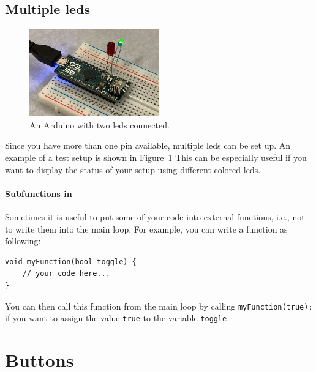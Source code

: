 \subsection{Multiple \acp{led}}

\begin{figure}[tb]
    \centering
    \includegraphics[width=0.5\textwidth]{graphics/01_blink/arduino_two_leds.jpg}
    \caption{An Arduino with two \acp{led} connected.}
    \label{fig:blink:arduino_two_leds}
\end{figure}
Since you have more than one pin available, multiple \acp{led} can be set up. An example of a test setup is shown in Figure~\ref{fig:blink:arduino_two_leds} This can be especially useful if you want to display the status of your setup using different colored \acp{led}.

\paragraph{Subfunctions in \cpp} Sometimes it is useful to put some of your code into external functions, i.e., not to write them into the main loop. For example, you can write a function as following:

\begin{lstlisting}
void myFunction(bool toggle) {
    // your code here...
}
\end{lstlisting}
You can then call this function from the main loop by calling \lstinline{myFunction(true);} if you want to assign the value \lstinline{true} to the variable \lstinline{toggle}.


\section{Buttons}

